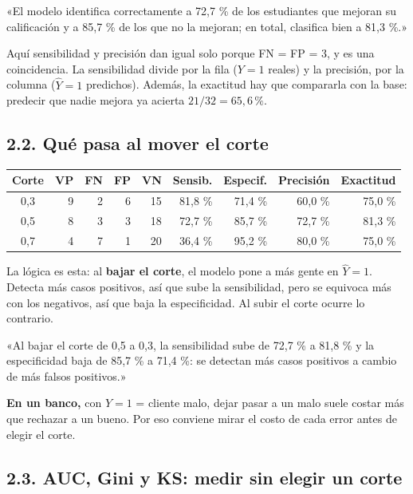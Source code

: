 \documentclass[11pt,letterpaper]{article}
\newcommand{\tema}[1]{\subsection*{#1}}
\begin{document}
\begin{frase}
«El modelo identifica correctamente a 72,7 \% de los estudiantes que mejoran su calificación y a 85,7 \% de los que no la mejoran; en total, clasifica bien a 81,3 \%.»
\end{frase}

\begin{trampa}
Aquí sensibilidad y precisión dan igual solo porque FN = FP = 3, y es una coincidencia. La sensibilidad divide por la fila ($Y=1$ reales) y la precisión, por la columna ($\hat Y=1$ predichos). Además, la exactitud hay que compararla con la base: predecir que nadie mejora ya acierta $21/32=65{,}6\,\%$.
\end{trampa}

\tema{2.2. Qué pasa al mover el corte}

\begin{center}
\begin{tabular}{crrrrrrrr}
\toprule
\textbf{Corte} & VP & FN & FP & VN & \textbf{Sensib.} & \textbf{Especif.} & \textbf{Precisión} & \textbf{Exactitud} \\
\midrule
0,3 & 9 & 2 & 6 & 15 & 81,8 \% & 71,4 \% & 60,0 \% & 75,0 \% \\
0,5 & 8 & 3 & 3 & 18 & 72,7 \% & 85,7 \% & 72,7 \% & 81,3 \% \\
0,7 & 4 & 7 & 1 & 20 & 36,4 \% & 95,2 \% & 80,0 \% & 75,0 \% \\
\bottomrule
\end{tabular}
\end{center}

La lógica es esta: al \textbf{bajar el corte}, el modelo pone a más gente en $\hat Y=1$. Detecta más casos positivos, así que sube la sensibilidad, pero se equivoca más con los negativos, así que baja la especificidad. Al subir el corte ocurre lo contrario.

\begin{frase}
«Al bajar el corte de 0,5 a 0,3, la sensibilidad sube de 72,7 \% a 81,8 \% y la especificidad baja de 85,7 \% a 71,4 \%: se detectan más casos positivos a cambio de más falsos positivos.»
\end{frase}

\textbf{En un banco,} con $Y=1$ = cliente malo, dejar pasar a un malo suele costar más que rechazar a un bueno. Por eso conviene mirar el costo de cada error antes de elegir el corte.

\tema{2.3. AUC, Gini y KS: medir sin elegir un corte}
\end{document}
